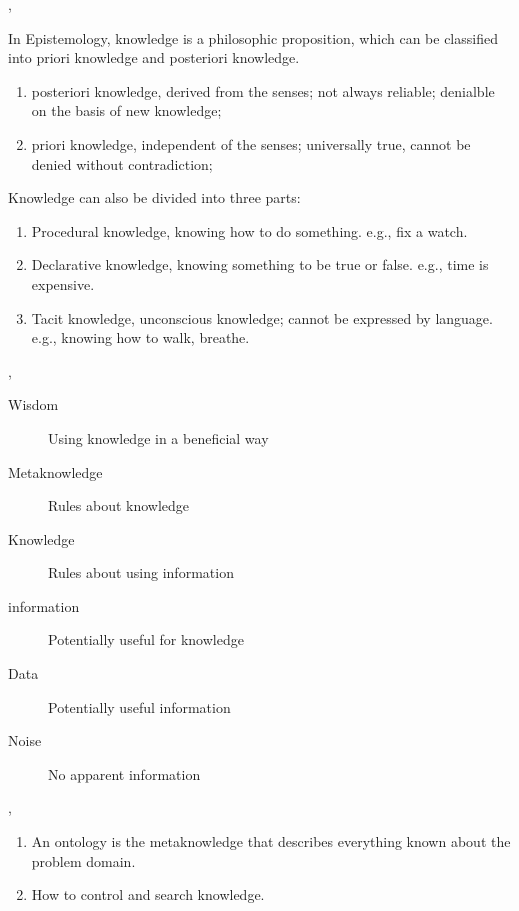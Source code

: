 \documentclass{article}
\begin{document}
	\sep


	\answer
	
	In Epistemology, knowledge is a philosophic proposition, which can be classified into priori knowledge and posteriori knowledge.

	\begin{enumerate}
		\item posteriori knowledge, derived from the senses; not always reliable; denialble on the basis of new knowledge;
		\item priori knowledge, independent of the senses; universally true, cannot be denied without contradiction;
	\end{enumerate}

	Knowledge can also be divided into three parts: 

	\begin{enumerate}
		\item Procedural knowledge, knowing how to do something. e.g., fix a watch.
		\item Declarative knowledge, knowing something to be true or false. e.g., time is expensive.
		\item Tacit knowledge, unconscious knowledge; cannot be expressed by language. e.g., knowing how to walk, breathe.
	\end{enumerate}
	
	\sep
	

	\answer

	\begin{description}
		\item[Wisdom] Using knowledge in a beneficial way
		\item[Metaknowledge] Rules about knowledge
		\item[Knowledge] Rules about using information
		\item[information] Potentially useful for knowledge
		\item[Data] Potentially useful information
		\item[Noise] No apparent information     
	\end{description}

	\sep


	\answer

	\begin{enumerate}
		\item An ontology is the metaknowledge that describes everything known about the problem domain.
		\item How to control and search knowledge.
	\end{enumerate}
\end{document}

